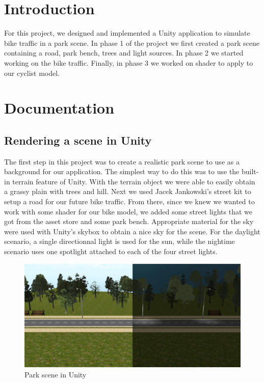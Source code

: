 \documentclass{scrartcl}
\begin{document}

\section{Introduction}

	For this project, we designed and implemented a Unity application to simulate bike traffic in a park scene. In phase 1 
	of the project we first created a park scene containing a road, park bench, trees and light sources. In phase 2 we started 
	working on the bike traffic. Finally, in phase 3 we worked on shader to apply to our cyclist model.
	
\section{Documentation}

	\subsection{Rendering a scene in Unity}
		The first step in this project was to create a realistic park scene to use as a background for our application. The simplest 
		way to do this was to use the built-in terrain feature of Unity. With the terrain object we were able to easily obtain a grassy 
		plain with trees and hill. Next we used Jacek Jankowski's street kit\parencite{Street:Jankowski} to setup a road for our future 
		bike traffic. From there, since we knew we wanted to work with some shader for our bike model, we added some street lights that 
		we got from the asset store\parencite{StreetLight:BiSkiT} and some park bench\parencite{Parkchair:Universal}. Appropriate material 
		for the sky were used with Unity's skybox to obtain a nice sky for the scene. For the daylight scenario, a single directionnal light is 
		used for the sun, while the nightime scenario uses one spotlight attached to each of the four street lights.
		
		\begin{figure}[h]
			\includegraphics[width=\textwidth]{parkDayNight}
			\caption{Park scene in Unity}
			\label{fig:park_scene}
		\end{figure}
		
\end{document}

